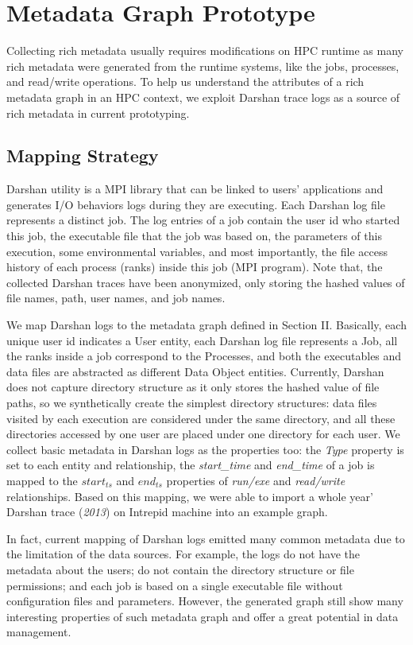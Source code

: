 \section{Metadata Graph Prototype}
Collecting rich metadata usually requires modifications on HPC runtime as many rich metadata were generated from the runtime systems, like the jobs, processes, and read/write operations. To help us understand the attributes of a rich metadata graph in an HPC context, we exploit Darshan trace logs as a source of rich metadata in current prototyping.

\subsection{Mapping Strategy}
Darshan utility is a MPI library that can be linked to users' applications and generates I/O behaviors logs during they are executing. Each Darshan log file represents a distinct job. The log entries of a job contain the user id who started this job, the executable file that the job was based on, the parameters of this execution, some environmental variables, and most importantly, the file access history of each process (ranks) inside this job (MPI program). Note that, the collected Darshan traces have been anonymized, only storing the hashed values of file names, path, user names, and job names.

We map Darshan logs to the metadata graph defined in Section II. Basically, each unique user id indicates a User entity, each Darshan log file represents a Job, all the ranks inside a job correspond to the Processes, and both the executables and data files are abstracted as different Data Object entities. Currently, Darshan does not capture directory structure as it only stores the hashed value of file paths, so we synthetically create the simplest directory structures: data files visited by each execution are considered under the same directory, and all these directories accessed by one user are placed under one directory for each user. We collect basic metadata in Darshan logs as the properties too: the \textit{Type} property is set to each entity and relationship, the \textit{start\_time} and \textit{end\_time} of a job is mapped to the $start_{ts}$ and $end_{ts}$ properties of \textit{run/exe} and \textit{read/write} relationships. Based on this mapping, we were able to import a whole year' Darshan trace (\textit{2013}) on Intrepid machine into an example graph.

In fact, current mapping of Darshan logs emitted many common metadata due to the limitation of the data sources. For example, the logs do not have the metadata about the users; do not contain the directory structure or file permissions; and each job is based on a single executable file without configuration files and parameters. However, the generated graph still show many interesting properties of such metadata graph and offer a great potential in data management.

